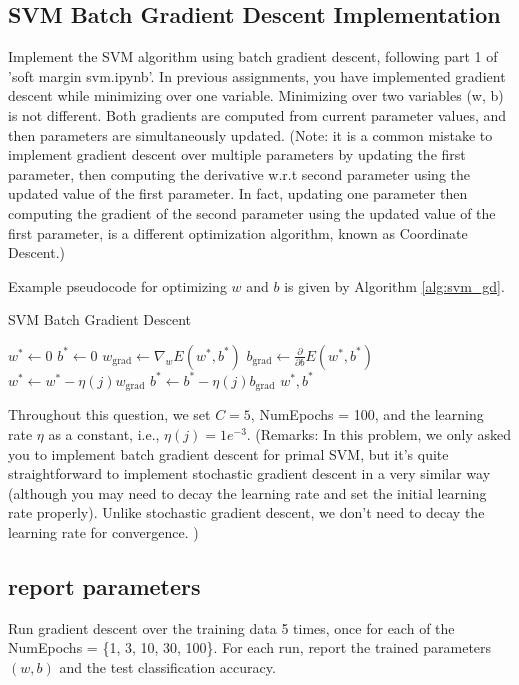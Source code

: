 \documentclass[lang=cn,11pt]{elegantbook}
\begin{document}
\subsection{SVM Batch Gradient Descent Implementation}
Implement the SVM algorithm using batch gradient descent, following part 1 of 'soft margin svm.ipynb'. In previous assignments, you have implemented gradient descent while minimizing over one variable. Minimizing over two variables (w, b) is not different. Both gradients are computed from current parameter values, and then parameters are simultaneously updated. (Note: it is a common mistake to implement gradient descent over multiple parameters by updating the first parameter, then computing the derivative w.r.t second parameter using the updated value of the first parameter. In fact, updating one parameter then computing the gradient of the second parameter using the updated value of the first parameter, is a different optimization algorithm, known as Coordinate Descent.)

Example pseudocode for optimizing $w$ and $b$ is given by Algorithm \ref{alg:svm_gd}.
\begin{algorithm}
\caption{SVM Batch Gradient Descent}
\label{alg:svm_gd}
\begin{algorithmic}
    \State $w^* \gets 0$
    \State $b^* \gets 0$
        \State $w_{\text{grad}} \gets \nabla_w E (w^*, b^*)$
        \State $b_{\text{grad}} \gets \frac{\partial}{\partial b} E (w^*, b^*)$
        \State $w^* \gets w^* - \eta(j) w_{\text{grad}}$
        \State $b^* \gets b^* - \eta(j) b_{\text{grad}}$
    \EndFor
    \State \Return $w^*, b^*$
\end{algorithmic}
\end{algorithm}


Throughout this question, we set $C = 5$, NumEpochs = 100, and the learning rate $\eta$ as a constant, i.e., $\eta(j) = 1e^{-3}$.
(Remarks: In this problem, we only asked you to implement batch gradient descent for primal SVM, but it’s quite straightforward to implement stochastic gradient descent in a very similar way (although you may need to decay the learning rate and set the initial learning rate properly). Unlike stochastic gradient descent, we don’t need to decay the learning rate for convergence. )

\subsection*{report parameters}
Run gradient descent over the training data 5 times, once for each of the NumEpochs = \{1, 3, 10, 30, 100\}. For each run, report the trained parameters $(w, b)$ and the test classification accuracy.
\end{document}
